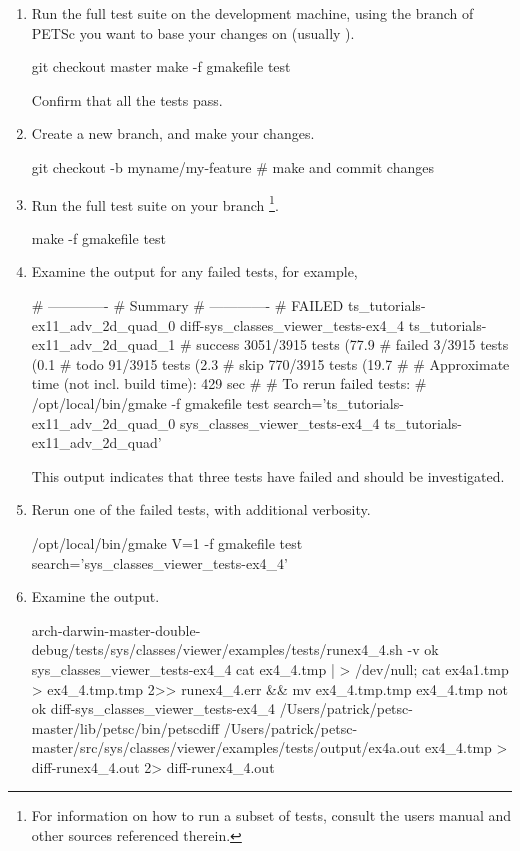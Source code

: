 \begin{enumerate}
\item Run the full test suite on the development machine, using the branch of PETSc you want to base your changes on (usually ).
\begin{bashlisting}
git checkout master
make -f gmakefile test
\end{bashlisting}
Confirm that all the tests pass.
\item Create a new branch, and make your changes.
\begin{bashlisting}
git checkout -b myname/my-feature
# make and commit changes
\end{bashlisting}
\item Run the full test suite on your branch \footnote{For information on how to run a subset of tests, consult the users manual and other sources referenced therein.}.
\begin{bashlisting}
make -f gmakefile test
\end{bashlisting}
\item Examine the output for any failed tests, for example,
\begin{outputlisting}
# -------------
#   Summary
# -------------
# FAILED ts_tutorials-ex11_adv_2d_quad_0 diff-sys_classes_viewer_tests-ex4_4 ts_tutorials-ex11_adv_2d_quad_1
# success 3051/3915 tests (77.9%
# failed 3/3915 tests (0.1%
# todo 91/3915 tests (2.3%
# skip 770/3915 tests (19.7%
#
# Approximate time (not incl. build time): 429 sec
#
# To rerun failed tests:
#     /opt/local/bin/gmake -f gmakefile test search='ts_tutorials-ex11_adv_2d_quad_0 sys_classes_viewer_tests-ex4_4 ts_tutorials-ex11_adv_2d_quad'
\end{outputlisting}
This output indicates that three tests have failed and should be investigated.
\item Rerun one of the failed tests, with additional verbosity.
\begin{bashlisting}
/opt/local/bin/gmake V=1 -f gmakefile test search='sys_classes_viewer_tests-ex4_4'
\end{bashlisting}
\item Examine the output.
\begin{outputlisting}
arch-darwin-master-double-debug/tests/sys/classes/viewer/examples/tests/runex4_4.sh  -v
ok sys_classes_viewer_tests-ex4_4 cat ex4_4.tmp | > /dev/null; cat ex4a1.tmp > ex4_4.tmp.tmp 2>> runex4_4.err && mv ex4_4.tmp.tmp ex4_4.tmp
not ok diff-sys_classes_viewer_tests-ex4_4 /Users/patrick/petsc-master/lib/petsc/bin/petscdiff  /Users/patrick/petsc-master/src/sys/classes/viewer/examples/tests/output/ex4a.out ex4_4.tmp > diff-runex4_4.out 2> diff-runex4_4.out

\end{outputlisting}
\end{enumerate}
